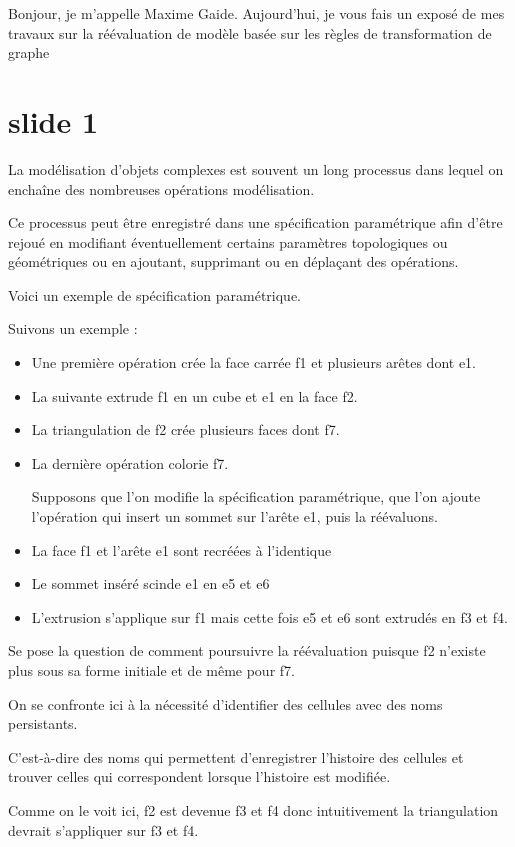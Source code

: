 \documentclass[11pt]{article}
\date{\today}
\title{}
\begin{document}
\tableofcontents

Bonjour, je m'appelle Maxime Gaide. Aujourd'hui, je vous fais un exposé de mes travaux sur la réévaluation de modèle basée sur les règles de transformation de graphe
\section{slide 1}
\label{sec:org2f29158}

La modélisation d'objets complexes est souvent un long processus dans lequel on
enchaîne des nombreuses opérations modélisation.

Ce processus peut être enregistré dans une spécification paramétrique afin
d'être rejoué en modifiant éventuellement certains paramètres topologiques ou
géométriques ou en ajoutant, supprimant ou en déplaçant des opérations.

Voici un exemple de spécification paramétrique.

Suivons un exemple :
\begin{itemize}
\item Une première opération crée la face carrée f1 et plusieurs arêtes dont e1.
\item La suivante extrude f1 en un cube et e1 en la face f2.
\item La triangulation de f2 crée plusieurs faces dont f7.
\item La dernière opération colorie f7.

Supposons que l'on modifie la spécification paramétrique, que l'on ajoute
l'opération qui insert un sommet sur l'arête e1, puis la réévaluons.

\item La face f1 et l'arête e1 sont recréées à l'identique
\item Le sommet inséré scinde e1 en e5 et e6
\item L'extrusion s'applique sur f1 mais cette fois e5 et e6 sont extrudés en f3 et f4.
\end{itemize}

Se pose la question de comment poursuivre la réévaluation puisque f2 n'existe
plus sous sa forme initiale et de même pour f7.

On se confronte ici à la nécessité d'identifier des cellules avec des noms persistants.

C'est-à-dire des noms qui permettent d'enregistrer l'histoire des cellules et
trouver celles qui correspondent lorsque l'histoire est modifiée.

Comme on le voit ici, f2 est devenue f3 et f4 donc intuitivement la
triangulation devrait s'appliquer sur f3 et f4.
\end{document}

